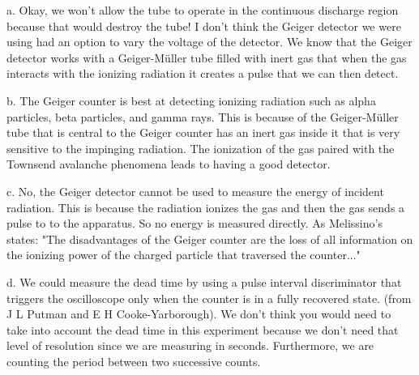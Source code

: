 \documentclass[12pt letterpaper]{article}
\begin{document}
a. Okay, we won't allow the tube to operate in the continuous discharge region because that would destroy the tube! I don't think the Geiger detector we were using had an option to vary the voltage of the detector. We know that the Geiger detector works with a Geiger-M\"uller tube filled with inert gas that when the gas interacts with the ionizing radiation it creates a pulse that we can then detect. 

\medskip
\noindent b. The Geiger counter is best at detecting ionizing radiation such as alpha particles, beta particles, and gamma rays. This is because of the Geiger-M\"uller tube that is central to the Geiger counter has an inert gas inside it that is very sensitive to the impinging radiation. The ionization of the gas paired with the Townsend avalanche phenomena leads to having a good detector. 

\medskip
\noindent c. No, the Geiger detector cannot be used to measure the energy of incident radiation. This is because the radiation ionizes the gas and then the gas sends a pulse to to the apparatus. So no energy is measured directly. As Melissino's states: "The disadvantages of the Geiger counter are the loss of all information on the ionizing power of the charged particle that traversed the counter..."  

\medskip 
\noindent d. We could measure the dead time by using a pulse interval discriminator that triggers the oscilloscope only when the counter is in a fully recovered state. (from J L Putman and E H Cooke-Yarborough). We don't think you would need to take into account the dead time in this experiment because we don't need that level of resolution since we are measuring in seconds. Furthermore, we are counting the period between two successive counts. 
\end{document}
